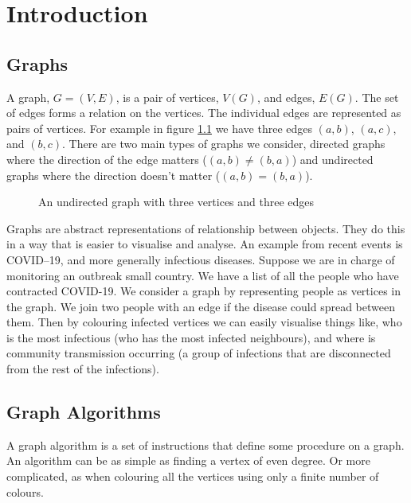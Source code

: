 \chapter{Introduction}\label{chpt:into}

\section{Graphs}
A graph, $G=(V,E)$, is a pair of vertices, $V(G)$, and edges, $E(G)$. The set of edges forms a relation on the vertices. The individual edges are represented as pairs of vertices. For example in figure \ref{fig:k3} we have three edges $(a,b)$, $(a,c)$, and $(b,c)$. There are two main types of graphs we consider, directed graphs where the direction of the edge matters ($(a,b)\neq (b,a)$) and undirected graphs where the direction doesn't matter ($(a,b)=(b,a)$). 

\begin{figure}[h]
    \centering
{}
    \caption{An undirected graph with three vertices and three edges}
\label{fig:k3}
\end{figure}
   
Graphs are abstract representations of relationship between objects. They do this in a way that is easier to visualise and analyse. An example from recent events is COVID--19, and more generally infectious diseases.  Suppose we are in charge of monitoring an outbreak small country. We have a list of all the people who have contracted COVID-19. We consider a graph by representing people as vertices in the graph. We join two people with an edge if the disease could spread between them.
Then by colouring infected vertices we can easily visualise things like, who is the most infectious (who has the most infected neighbours), and where is community transmission occurring (a group of infections that are disconnected from the rest of the infections).
  
\section{Graph Algorithms}
A graph algorithm is a set of instructions that define some procedure on a graph. An algorithm can be as simple as finding a vertex of even degree. Or more complicated, as when colouring all the vertices using only a finite number of colours.  

